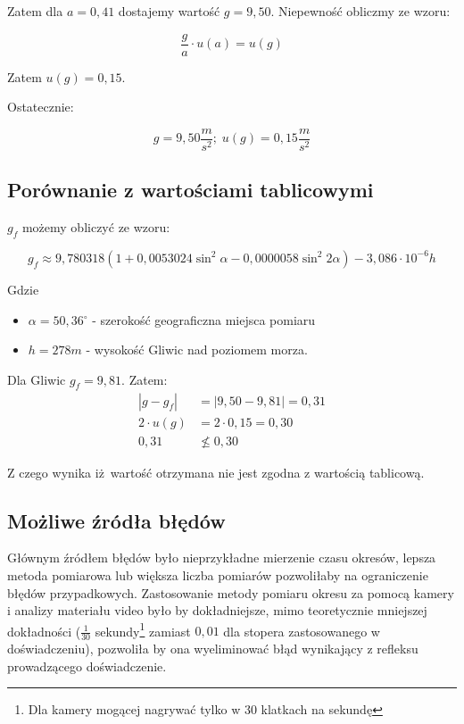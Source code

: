 \documentclass[a4paper,12pt]{article}
\newcommand{\stopnie}{\ensuremath{^{\circ}}}
\begin{document}
Zatem dla $a = 0,41$ dostajemy wartość $g = 9,50$. Niepewność obliczmy ze wzoru:

\[ \frac{g}{a} \cdot u\left(a\right) = u\left(g\right) \]

Zatem $u\left(g\right) = 0,15$.

Ostatecznie:

\[ g = 9,50 \frac{m}{s^2};\;  u\left(g\right) = 0,15 \frac{m}{s^2} \]

\subsection*{Porównanie z wartościami tablicowymi}

$g_f$ możemy obliczyć ze wzoru\cite{wzor}:

\[g_f \approx 9,780318 \left(1 + 0,0053024 \sin^2 \alpha - 0,0000058 \sin^2 2\alpha\right) - 3,086 \cdot 10^{ -6} h\]

Gdzie
\begin{itemize}
	\item $\alpha = 50,36\stopnie$ - szerokość geograficzna miejsca pomiaru
	\item $h = 278m$ - wysokość Gliwic nad poziomem morza.
\end{itemize}

Dla Gliwic $g_f = 9,81$. Zatem:
\begin{align*}
	\left| g - g_f \right|  & = \left| 9,50 - 9,81 \right| = 0,31 \\
	2 \cdot u\left(g\right) & = 2 \cdot 0,15 = 0,30               \\
	0,31\,                  & \not\leq 0,30
\end{align*}

Z czego wynika iż wartość otrzymana nie jest zgodna z wartością tablicową.

\subsection*{Możliwe źródła błędów}

Głównym źródłem błędów było nieprzykładne mierzenie czasu okresów, lepsza metoda pomiarowa lub większa liczba pomiarów pozwoliłaby na ograniczenie błędów przypadkowych. Zastosowanie metody pomiaru okresu za pomocą kamery i analizy materiału video było by dokładniejsze, mimo teoretycznie mniejszej dokładności ($\frac{1}{30}$ sekundy\footnote{Dla kamery mogącej nagrywać tylko w 30 klatkach na sekundę} zamiast $0,01$ dla stopera zastosowanego w doświadczeniu), pozwoliła by ona wyeliminować błąd wynikający z refleksu prowadzącego doświadczenie.



\end{document}
